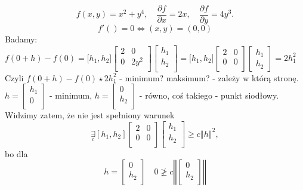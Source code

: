 \documentclass[../main.tex]{subfiles}
\begin{document}
\begin{przyklad}

    \[
        f(x,y) = x^2 + y^4,\quad \frac{\partial f}{\partial x} = 2x,\quad \frac{\partial f}{\partial y} = 4y^3
    .\]
\[
    f'() = 0 \iff (x,y) = (0,0)
\]
Badamy: $f(0+h) - f(0) = \big [ h_1, h_2 \big ] \left [ \begin{matrix}
2 &0\\
0 &2y^2\\
\end{matrix}\right ]
\left [ \begin{matrix}
h_1\\
h_2\\\end{matrix}\right ]
= \big [ h_1, h_2 \big ] \left [ \begin{matrix}
2 &0\\
0 &0\\ \end{matrix}\right ]
\left [ \begin{matrix} h_1\\
h_2\end{matrix}\right ] = 2h_1^2$
Czyli $f(0+h) - f(0) \star  2h_1^2$ - minimum? maksimum? - zależy w którą stronę.\\
$h = \left [ \begin{matrix}
h_1\\
0\\
\end{matrix}\right ] $ - minimum,
$h = \left [ \begin{matrix}
0\\
h_2\\
\end{matrix}\right ] $ - równo,
coś takiego - punkt siodłowy.\\
Widzimy zatem, że nie jest spełniony warunek
\[
    \underset{c}{\exists}\left[ h_1, h_2 \right ] \left[ \begin{matrix}
2 &0\\
0 &0\\
\end{matrix}\right ]
\left [ \begin{matrix}
h_1\\
h_2\\
    \end{matrix}\right ] \geq c \left\Vert h \right\Vert ^2
,\]
bo dla
\[
    h = \left [ \begin{matrix}
0\\
h_2\\
    \end{matrix}\right ] \quad 0 \not\geq c \left\Vert \left [ \begin{matrix}
0\\
h_2\\
\end{matrix}\right ] \right\Vert
\]
\end{przyklad}
\end{document}
